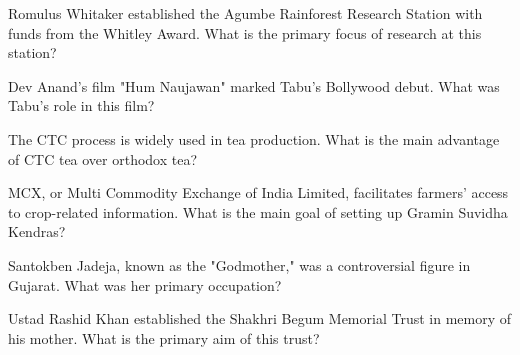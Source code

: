 \documentclass[12pt,a4paper]{book}
\begin{document}
\begin{enhancedmcq}[Question 19]{Romulus Whitaker established the Agumbe Rainforest Research Station with funds from the Whitley Award. What is the primary focus of research at this station?}
\end{enhancedmcq}

\begin{enhancedmcq}[Question 20]{Dev Anand's film "Hum Naujawan" marked Tabu's Bollywood debut. What was Tabu's role in this film?}
\end{enhancedmcq}

\begin{enhancedmcq}[Question 21]{The CTC process is widely used in tea production. What is the main advantage of CTC tea over orthodox tea?}
\end{enhancedmcq}

\begin{enhancedmcq}[Question 22]{MCX, or Multi Commodity Exchange of India Limited, facilitates farmers' access to crop-related information. What is the main goal of setting up Gramin Suvidha Kendras?}
\end{enhancedmcq}

\begin{enhancedmcq}[Question 23]{Santokben Jadeja, known as the "Godmother," was a controversial figure in Gujarat. What was her primary occupation?}
\end{enhancedmcq}

\begin{enhancedmcq}[Question 24]{Ustad Rashid Khan established the Shakhri Begum Memorial Trust in memory of his mother. What is the primary aim of this trust?}
\end{enhancedmcq}
\end{document}
